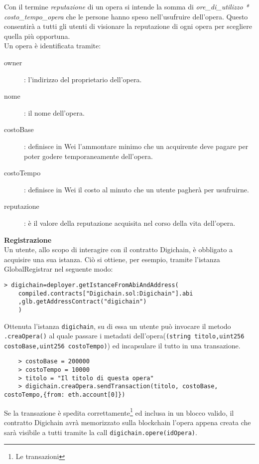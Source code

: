 	Con il termine \textit{reputazione} di un opera si intende la somma di \textit{ore\_di\_utilizzo * costo\_tempo\_opera} che le persone hanno speso nell'usufruire dell'opera. Questo consentirà a tutti gli utenti di visionare la reputazione di ogni opera per scegliere quella più opportuna.
	\\

	
	Un opera è identificata tramite:
	\begin{description}
		\item[owner]: l'indirizzo del proprietario dell'opera. 
		\item[nome]: il nome dell'opera.
		\item[costoBase]: definisce in Wei l'ammontare minimo che un acquirente deve pagare per poter godere temporaneamente dell'opera.
		\item[costoTempo]: definisce in Wei il costo al minuto che un utente pagherà per usufruirne.
		\item[reputazione]: è il valore della reputazione acquisita nel corso della vita dell'opera.
	\end{description}
	
	\textbf{Registrazione}\\
	
	Un utente, allo scopo di interagire con il contratto Digichain, è obbligato a acquisire una sua istanza. Ciò si ottiene, per esempio, tramite l'istanza GlobalRegistrar nel seguente modo:
	
\begin{lstlisting}
> digichain=deployer.getIstanceFromAbiAndAddress(
	compiled.contracts["Digichain.sol:Digichain"].abi
	,glb.getAddressContract("digichain")
	)	
\end{lstlisting}
	
	Ottenuta l'istanza \lstinline|digichain|, su di essa un utente può invocare il metodo \lstinline|.creaOpera()| al quale passare i metadati dell'opera(\lstinline|(string titolo,uint256 costoBase,uint256 costoTempo)|) ed incapsulare il tutto in una transazione. 
	
	\begin{lstlisting}
	> costoBase = 200000
	> costoTempo = 10000
	> titolo = "Il titolo di questa opera"
	> digichain.creaOpera.sendTransaction(titolo, costoBase, costoTempo,{from: eth.account[0]})
	\end{lstlisting}
	
	Se la transazione è spedita correttamente\footnote{Le transazioni } ed inclusa in un blocco valido, il contratto Digichain avrà memorizzato sulla blockchain l'opera appena creata che sarà visibile a tutti tramite la call \lstinline|digichain.opere(idOpera)|.\\
	
